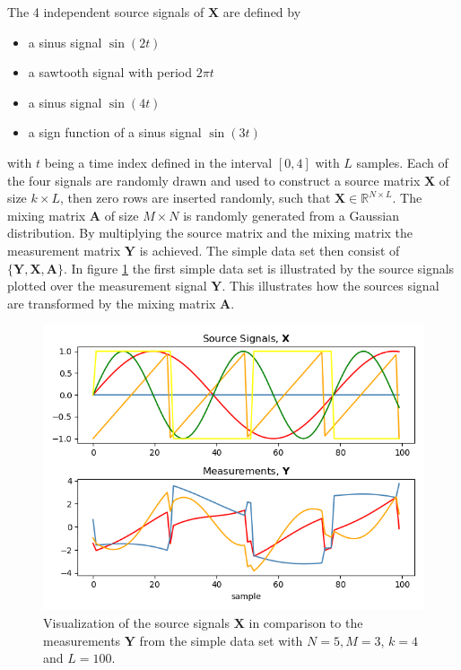 The 4 independent source signals of $\mathbf{X}$ are defined by 
\begin{itemize}
\item[1.] a sinus signal $\sin(2t)$
\item[2.] a sawtooth signal with period $2 \pi t$
\item[3.] a sinus signal $\sin(4t)$
\item[4.] a sign function of a sinus signal $\sin(3t)$
\end{itemize}
with $t$ being a time index defined in the interval $[0,4]$ with $L$ samples. Each of the four signals are randomly drawn and used to construct a source matrix $\mathbf{X}$ of size $k \times L$, then zero rows are inserted randomly, such that $\mathbf{X} \in \mathbb{R}^{N \times L}$. 
The mixing matrix $\mathbf{A}$ of size $M \times N$ is randomly generated from a Gaussian distribution. 
By multiplying the source matrix and the mixing matrix the measurement matrix $\mathbf{Y}$ is achieved.
The simple data set then consist of $\{ \mathbf{Y}, \mathbf{X}, \mathbf{A} \}$.
In figure \ref{fig:simple} the first simple data set is illustrated by the source signals plotted over the measurement signal $\mathbf{Y}$. This illustrates how the sources signal are transformed by the mixing matrix $\mathbf{A}$.
\begin{figure}[H]
\centering
\includegraphics[scale=0.5]{figures/ch_6/simple_data.png}
\caption{Visualization of the source signals $\mathbf{X}$ in comparison to the measurements $\mathbf{Y}$ from the simple data set with $N = 5, M = 3$, $k = 4$ and $L=100$.}
\label{fig:simple}
\end{figure}
\noindent

